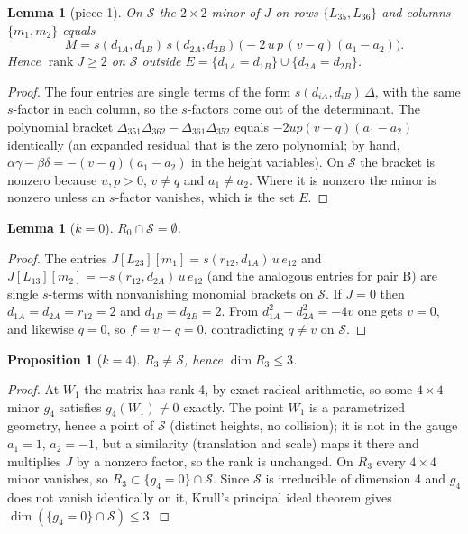 \documentclass[11pt]{article}
\newtheorem{proposition}[theorem]{Proposition}
\newtheorem{lemma}[theorem]{Lemma}
\theoremstyle{definition}
\theoremstyle{remark}
\begin{document}
\begin{lemma}[piece 1]\label{lem:piece1}
On $\mathcal S$ the $2\times2$ minor of $J$ on rows $\{L_{35},L_{36}\}$ and columns $\{m_1,m_2\}$ equals
\begin{equation}\label{eq:piece1}
M=s(d_{1A},d_{1B})\,s(d_{2A},d_{2B})\,\bigl(-2\,u\,p\,(v-q)(a_1-a_2)\bigr).
\end{equation}
Hence $\operatorname{rank}J\ge2$ on $\mathcal S$ outside $E=\{d_{1A}=d_{1B}\}\cup\{d_{2A}=d_{2B}\}$.
\end{lemma}
\begin{proof}
The four entries are single terms of the form $s(d_{iA},d_{iB})\,\Delta$, with the same $s$-factor in each column,
so the $s$-factors come out of the determinant. The polynomial bracket $\Delta_{351}\Delta_{362}-\Delta_{361}\Delta_{352}$
equals $-2up(v-q)(a_1-a_2)$ identically (an expanded residual that is the zero polynomial; by hand,
$\alpha\gamma-\beta\delta=-(v-q)(a_1-a_2)$ in the height variables). On $\mathcal S$ the bracket is nonzero because
$u,p>0$, $v\ne q$ and $a_1\ne a_2$. Where it is nonzero the minor is nonzero unless an $s$-factor vanishes,
which is the set $E$.
\end{proof}

\begin{lemma}[$k=0$]\label{lem:r0}
$R_0\cap\mathcal S=\emptyset$.
\end{lemma}
\begin{proof}
The entries $J[L_{23}][m_1]=s(r_{12},d_{1A})\,u\,e_{12}$ and $J[L_{13}][m_2]=-s(r_{12},d_{2A})\,u\,e_{12}$ (and the
analogous entries for pair B) are single $s$-terms with nonvanishing monomial brackets on $\mathcal S$. If $J=0$ then
$d_{1A}=d_{2A}=r_{12}=2$ and $d_{1B}=d_{2B}=2$. From $d_{1A}^2-d_{2A}^2=-4v$ one gets $v=0$, and likewise $q=0$,
so $f=v-q=0$, contradicting $q\ne v$ on $\mathcal S$.
\end{proof}

\begin{proposition}[$k=4$]\label{prop:k4}
$R_3\ne\mathcal S$, hence $\dim R_3\le3$.
\end{proposition}
\begin{proof}
At $W_1$ the matrix has rank 4, by exact radical arithmetic, so some $4\times4$ minor $g_4$ satisfies $g_4(W_1)\ne0$
exactly. The point $W_1$ is a parametrized geometry, hence a point of $\mathcal S$ (distinct heights, no collision); it is not in the gauge $a_1=1$, $a_2=-1$, but a similarity
(translation and scale) maps it there and multiplies $J$ by a nonzero factor, so the rank is unchanged. On $R_3$ every $4\times4$ minor
vanishes, so $R_3\subset\{g_4=0\}\cap\mathcal S$. Since $\mathcal S$ is irreducible of dimension 4 and $g_4$ does not vanish
identically on it, Krull's principal ideal theorem gives $\dim(\{g_4=0\}\cap\mathcal S)\le3$.
\end{proof}
\end{document}
